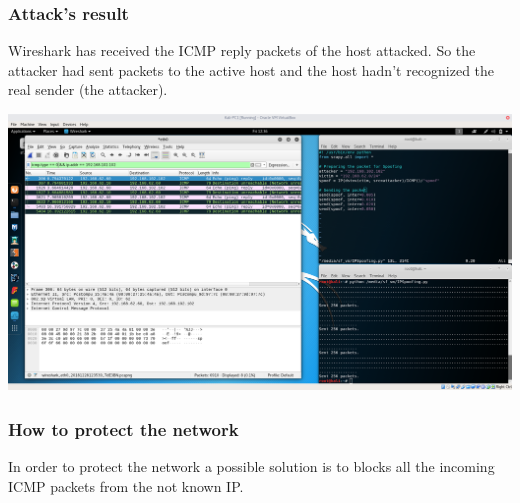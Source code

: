 \subsubsection{Attack's result}
Wireshark has received the ICMP reply packets of the host attacked. So the attacker had sent packets to the active host and the host hadn't recognized the real sender (the attacker).\par
\includegraphics[width=16cm]{img/IPSpoofingReply.png}

\subsubsection{How to protect the network}
In order to protect the network a possible solution is to blocks all the incoming ICMP packets from the not known IP.\par
